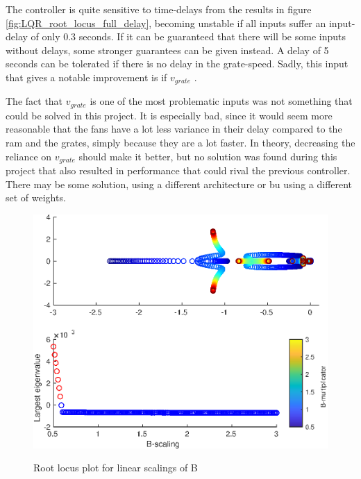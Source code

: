 The controller is quite sensitive to time-delays from the results in figure \ref{fig:LQR_root_locus_full_delay}, becoming unstable if all inputs suffer an input-delay of only 0.3 seconds. If it can be guaranteed that there will be some inputs without delays, some stronger guarantees can be given instead. A delay of 5 seconds can be tolerated if there is no delay in the grate-speed. Sadly, this input that gives a notable improvement is if $v_{grate}$ .


\noindent 
The fact that $v_{grate}$ is one of the most problematic inputs was not something that could be solved in this project. It is especially bad, since it would seem more reasonable that the fans have a lot less variance in their delay compared to the ram and the grates, simply because they are a lot faster. In theory, decreasing the reliance on $v_{grate}$ should make it better, but no solution was found during this project that also resulted in performance that could rival the previous controller. There may be some solution, using a different architecture or bu using a different set of weights. 



\begin{figure}
    \includegraphics[width=\textwidth]{img/Fig_dump/B_scaling_root_locusLQRDiffIntegralAgnostic_params.eps}
    \label{fig:LQR_root_locus_B}
    \caption{Root locus plot for linear scalings of B}
\end{figure}



